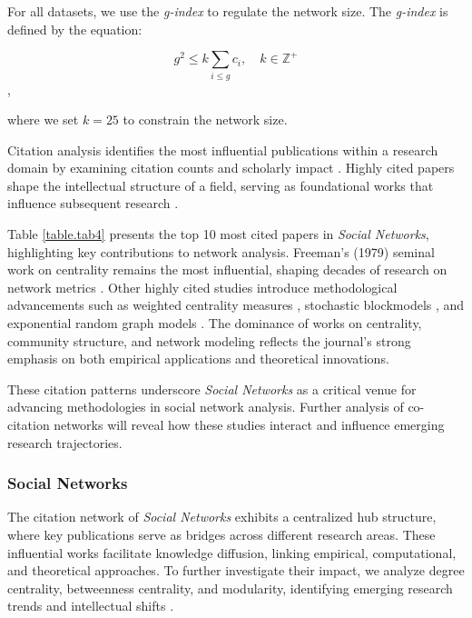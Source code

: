 \documentclass[twocolumn]{article}
\begin{document}
For all datasets, we use the \textit{g-index} to regulate the network size. The \textit{g-index} is defined by the equation:

$$g^2 \leq k \sum_{i \leq g} c_i, \quad k \in \mathbb{Z}^+$$,

where we set $k = 25$ to constrain the network size.


Citation analysis identifies the most influential publications within a research domain by examining citation counts and scholarly impact \cite{Garfield1972, Small1973}. Highly cited papers shape the intellectual structure of a field, serving as foundational works that influence subsequent research \cite{Leydesdorff1998, Moed2005}. 

Table \ref{table.tab4} presents the top 10 most cited papers in \textit{Social Networks}, highlighting key contributions to network analysis. Freeman’s (1979) seminal work on centrality remains the most influential, shaping decades of research on network metrics \cite{Freeman1979}. Other highly cited studies introduce methodological advancements such as weighted centrality measures \cite{Opsahl2010}, stochastic blockmodels \cite{Holland1983}, and exponential random graph models \cite{Robins2007}. The dominance of works on centrality, community structure, and network modeling reflects the journal’s strong emphasis on both empirical applications and theoretical innovations.

These citation patterns underscore \textit{Social Networks} as a critical venue for advancing methodologies in social network analysis. Further analysis of co-citation networks will reveal how these studies interact and influence emerging research trajectories.


	\subsubsection*{Social Networks}
	
	The citation network of \textit{Social Networks} exhibits a centralized hub structure, where key publications serve as bridges across different research areas. These influential works facilitate knowledge diffusion, linking empirical, computational, and theoretical approaches. To further investigate their impact, we analyze degree centrality, betweenness centrality, and modularity, identifying emerging research trends and intellectual shifts \cite{snijders2010stochastic, Holland1983}.
	
\end{document}
